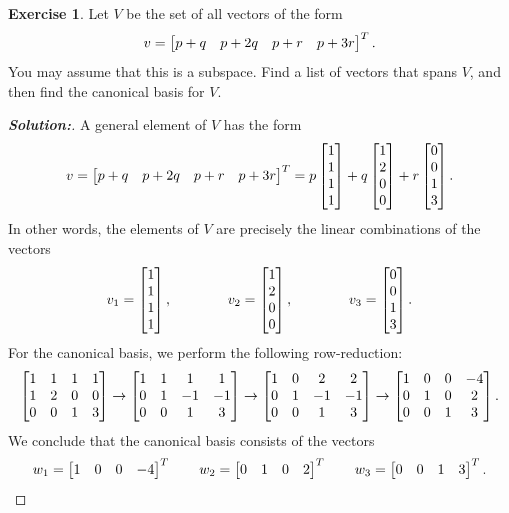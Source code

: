 \documentclass[a4paper]{amsart}
\theoremstyle{definition}
\newtheorem{exercise}{Exercise}
\newenvironment{solution}{\begin{proof}[\textbf{Solution:}] \vphantom{u}}{\end{proof}}
\begin{document}
\begin{exercise}\label{ex-span-canonical-i}
 Let $V$ be the set of all vectors of the form 
 \[ v = \left[\begin{matrix} p+q & p+2q & p+r & p+3r \end{matrix}\right]^T. \]
 You may assume that this is a subspace.  Find a list of vectors that
 spans $V$, and then find the canonical basis for $V$.
\end{exercise}
\begin{solution}
 A general element of $V$ has the form
 \[ v = 
     \left[\begin{matrix} p+q & p+2q & p+r & p+3r \end{matrix}\right]^T = 
     p \left[\begin{matrix} 1\\1\\1\\1\end{matrix}\right] + 
     q \left[\begin{matrix} 1\\2\\0\\0\end{matrix}\right] +
     r \left[\begin{matrix} 0\\0\\1\\3\end{matrix}\right].
 \]
 In other words, the elements of $V$ are precisely the linear
 combinations of the vectors
 \[ v_1 = \left[\begin{matrix} 1 \\ 1 \\ 1 \\ 1 \end{matrix}\right] , \hspace{4em} 
    v_2 = \left[\begin{matrix} 1 \\ 2 \\ 0 \\ 0 \end{matrix}\right] , \hspace{4em} 
    v_3 = \left[\begin{matrix} 0 \\ 0 \\ 1 \\ 3 \end{matrix}\right].
 \]
 For the canonical basis, we perform the following row-reduction:
 \[ 
  \left[\begin{matrix} 
   1 & 1 & 1 & 1 \\
   1 & 2 & 0 & 0 \\
   0 & 0 & 1 & 3
  \end{matrix}\right]
  \to 
  \left[\begin{matrix} 
   1 & 1 & 1 & 1 \\
   0 & 1 &-1 &-1 \\
   0 & 0 & 1 & 3
  \end{matrix}\right]
  \to 
  \left[\begin{matrix} 
   1 & 0 & 2 & 2 \\
   0 & 1 &-1 &-1 \\
   0 & 0 & 1 & 3
  \end{matrix}\right]
  \to 
  \left[\begin{matrix} 
   1 & 0 & 0 &-4 \\
   0 & 1 & 0 & 2 \\
   0 & 0 & 1 & 3
  \end{matrix}\right].
 \]
 We conclude that the canonical basis consists of the vectors
 \[ 
   w_1 = \left[\begin{matrix} 1 & 0 & 0 & -4 \end{matrix}\right]^T \hspace{2em}
   w_2 = \left[\begin{matrix} 0 & 1 & 0 &  2 \end{matrix}\right]^T \hspace{2em}
   w_3 = \left[\begin{matrix} 0 & 0 & 1 &  3 \end{matrix}\right]^T.
 \]
\end{solution}
\end{document}
